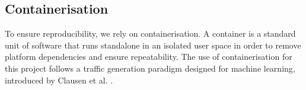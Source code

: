 \documentclass[runningheads,11pt]{llncs}\usepackage[]{graphicx}\usepackage[]{color}
\begin{document}
\subsection{Containerisation}

To ensure reproducibility, we rely on containerisation. A container is a standard unit of software that runs standalone in an isolated user space in order to remove platform dependencies and ensure repeatability. The use of containerisation for this project follows a traffic generation paradigm designed for machine learning, introduced by Clausen et al. \cite{clausen2019traffic}.%







\end{document}
